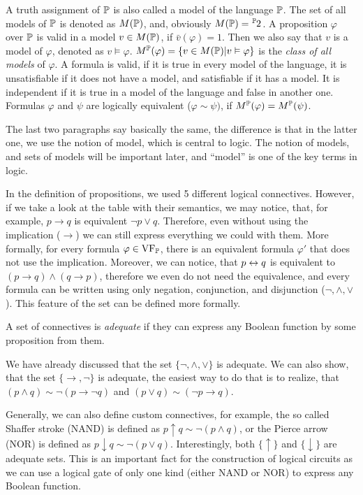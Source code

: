 A truth assignment of $\mathbb{P}$ is also called a model of the language $\mathbb{P}$. The set of all models of $\mathbb{P}$ is denoted as $M(\mathbb{P})$, and, obviously $M(\Prop) = \fset{\Prop}{2}$. A proposition $\varphi$ over $\mathbb{P}$ is valid in a model $v \in M(\mathbb{P})$, if $\bar{v}(\varphi) = 1$. Then we also say that $v$ is a model of $\varphi$, denoted as $v \vDash \varphi$. $M^\mathbb{P}(\varphi) = \{v \in M(\mathbb{P}) | v \vDash \varphi\}$ is the \emph{class of all models} of $\varphi$. A formula is valid, if it is true in every model of the language, it is unsatisfiable if it does not have a model, and satisfiable if it has a model. It is independent if it is true in a model of the language and false in another one. Formulas $\varphi$ and $\psi$ are logically equivalent ($\varphi \sim \psi)$, if $M^\mathbb{P}(\varphi) = M^\mathbb{P}(\psi)$.

The last two paragraphs say basically the same, the difference is that in the latter one, we use the notion of model, which is central to logic. The notion of models, and sets of models will be important later, and ``model'' is one of the key terms in logic.

In the definition of propositions, we used 5 different logical connectives. However, if we take a look at the table with their semantics, we may notice, that, for example, $p \to q$ is equivalent $\neg p \lor q$. Therefore, even without using the implication ($\to$) we can still express everything we could with them. More formally, for every formula $\varphi \in \operatorname{VF}_\mathbb{P}$, there is an equivalent formula $\varphi'$ that does not use the implication. Moreover, we can notice, that $p \leftrightarrow q$ is equivalent to $(p \to q) \land (q \to p)$, therefore we even do not need the equivalence, and every formula can be written using only negation, conjunction, and disjunction ($\neg, \land, \lor$). This feature of the set can be defined more formally.

\begin{definition}
A set of connectives is \emph{adequate} if they can express any Boolean function by some proposition from them.
\end{definition}

We have already discussed that the set $\{\neg, \land, \lor\}$ is adequate. We can also show, that the set $\{\to, \neg\}$ is adequate, the easiest way to do that is to realize, that $(p \land q) \sim \neg (p \to \neg q)$ and $(p \lor q) \sim (\neg p \to q)$. 

Generally, we can also define custom connectives, for example, the so called Shaffer stroke (NAND) is defined as $p \uparrow q \sim \neg (p \land q)$, or the Pierce arrow (NOR) is defined as $p \downarrow q \sim \neg (p \lor q)$. Interestingly, both $\{\uparrow\}$ and $\{\downarrow\}$ are adequate sets. This is an important fact for the construction of logical circuits as we can use a logical gate of only one kind (either NAND or NOR) to express any Boolean function.

